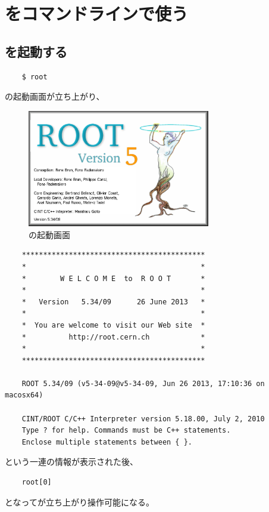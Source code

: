 \documentclass{jarticle}
\begin{document}
\clearpage

 \section{\ROOT をコマンドラインで使う}


  \subsection{\ROOT を起動する}
\begin{verbatim}
	$ root
\end{verbatim}
\ROOT の起動画面が立ち上がり、
\begin{figure}[htbp]
 \begin{center}
  \includegraphics[width = 80mm]{./picture/root_starting.eps}
 \end{center}
 \caption{\ROOT の起動画面}
 \label{Fig:root_starting}
\end{figure}
\begin{verbatim}
	*******************************************
	*                                         *
	*        W E L C O M E  to  R O O T       *
	*                                         *
	*   Version   5.34/09      26 June 2013   *
	*                                         *
	*  You are welcome to visit our Web site  *
	*          http://root.cern.ch            *
	*                                         *
	*******************************************

	ROOT 5.34/09 (v5-34-09@v5-34-09, Jun 26 2013, 17:10:36 on macosx64)

	CINT/ROOT C/C++ Interpreter version 5.18.00, July 2, 2010
	Type ? for help. Commands must be C++ statements.
	Enclose multiple statements between { }.
\end{verbatim}
という一連の情報が表示された後、
\begin{verbatim}
	root[0]
\end{verbatim}
となって\ROOT が立ち上がり操作可能になる。
\end{document}
